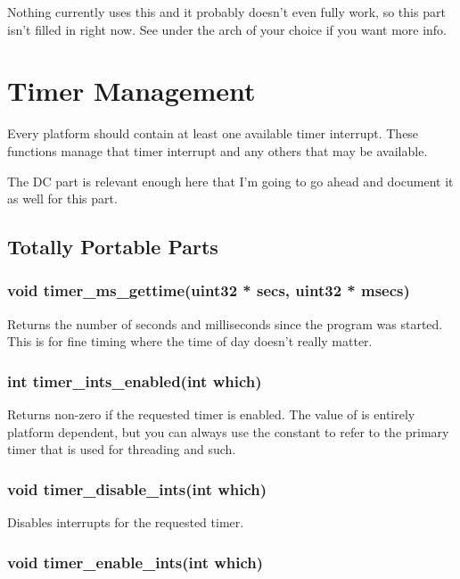 \documentclass[english]{report}
\begin{document}
Nothing currently uses this and it probably doesn't even fully work,
so this part isn't filled in right now. See  under the arch
of your choice if you want more info.


\section{Timer Management}

Every platform should contain at least one available timer interrupt.
These functions manage that timer interrupt and any others that may
be available.

The DC part is relevant enough here that I'm going to go ahead and
document it as well for this part.


\subsection{Totally Portable Parts}

\subsubsection{void timer\_ms\_gettime(uint32 * secs, uint32 * msecs)}

Returns the number of seconds and milliseconds since the program was
started. This is for fine timing where the time of day doesn't really
matter.

\subsubsection{int timer\_ints\_enabled(int which)}

Returns non-zero if the requested timer is enabled. The value of
 is entirely platform dependent, but you can always
use the constant  to refer to the primary
timer that is used for threading and such.

\subsubsection{void timer\_disable\_ints(int which)}

Disables interrupts for the requested timer.

\subsubsection{void timer\_enable\_ints(int which)}
\end{document}
